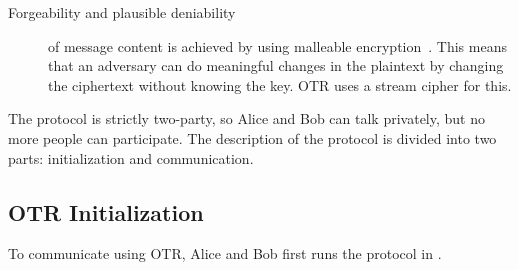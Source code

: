 \begin{description}
  \item[Forgeability and plausible deniability] of message content is achieved 
    by using malleable encryption~\cite{nonmalleable}.
    This means that an adversary can do meaningful changes in the plaintext by 
    changing the ciphertext without knowing the key.
    \ac{OTR} uses a stream cipher for this.
\end{description}

The protocol is strictly two-party, so Alice and Bob can talk privately, but no 
more people can participate.
The description of the protocol is divided into two parts: initialization and 
communication.

\subsection{\acs{OTR} Initialization}

To communicate using \ac{OTR}, Alice and Bob first runs the protocol in 
.

